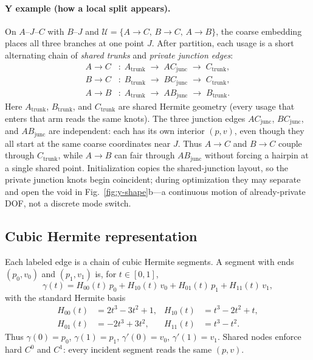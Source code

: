 \paragraph{Y example (how a local split appears).}
On $A$--$J$--$C$ with $B$--$J$ and
$\mathcal{U}=\{A\!\to\!C,\,B\!\to\!C,\,A\!\to\!B\}$, the coarse embedding places
all three branches at one point $J$.
After partition, each usage is a short alternating chain of
\emph{shared trunks} and \emph{private junction edges}:
\begin{align*}
A\!\to\!C &:\;
  A_{\mathrm{trunk}}
  \;\to\;
  AC_{\mathrm{junc}}
  \;\to\;
  C_{\mathrm{trunk}},
\\
B\!\to\!C &:\;
  B_{\mathrm{trunk}}
  \;\to\;
  BC_{\mathrm{junc}}
  \;\to\;
  C_{\mathrm{trunk}},
\\
A\!\to\!B &:\;
  A_{\mathrm{trunk}}
  \;\to\;
  AB_{\mathrm{junc}}
  \;\to\;
  B_{\mathrm{trunk}}.
\end{align*}
Here $A_{\mathrm{trunk}}$, $B_{\mathrm{trunk}}$, and $C_{\mathrm{trunk}}$ are
shared Hermite geometry (every usage that enters that arm reads the same knots).
The three junction edges $AC_{\mathrm{junc}}$, $BC_{\mathrm{junc}}$, and
$AB_{\mathrm{junc}}$ are independent: each has its own interior $(p,v)$, even
though they all start at the same coarse coordinates near $J$.
Thus $A\!\to\!C$ and $B\!\to\!C$ couple through $C_{\mathrm{trunk}}$, while
$A\!\to\!B$ can fair through $AB_{\mathrm{junc}}$ without forcing a hairpin at a
single shared point.
Initialization copies the shared-junction layout, so the private junction knots
begin coincident; during optimization they may separate and open the void in
Fig.~\ref{fig:y-shape}b---a continuous motion of already-private DOF, not a
discrete mode switch.

\subsection{Cubic Hermite representation}
\label{sec:method:hermite}

Each labeled edge is a chain of cubic Hermite segments.
A segment with ends $(p_0,v_0)$ and $(p_1,v_1)$ is, for $t\in[0,1]$,
\begin{equation}
\label{eq:hermite}
\gamma(t)
=
H_{00}(t)\,p_0
+ H_{10}(t)\,v_0
+ H_{01}(t)\,p_1
+ H_{11}(t)\,v_1,
\end{equation}
with the standard Hermite basis
\begin{align*}
H_{00}(t) &= 2t^{3}-3t^{2}+1, &
H_{10}(t) &= t^{3}-2t^{2}+t, \\
H_{01}(t) &= -2t^{3}+3t^{2}, &
H_{11}(t) &= t^{3}-t^{2}.
\end{align*}
Thus $\gamma(0)=p_0$, $\gamma(1)=p_1$, $\gamma'(0)=v_0$, $\gamma'(1)=v_1$.
Shared nodes enforce hard $C^{0}$ and $C^{1}$: every incident segment reads the
same $(p,v)$.

